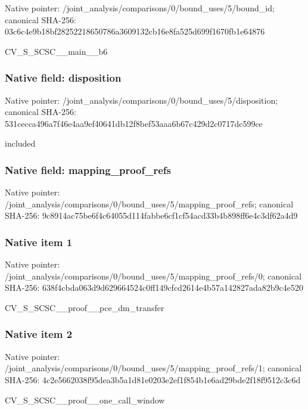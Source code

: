 \documentclass[10pt,a4paper]{article}
\begin{document}
Native pointer: /joint\_analysis/comparis\allowbreak{}ons/0/bound\_uses/5/bound\allowbreak{}\_id; canonical SHA-256: 03c6c4e9b18bf28252218650\allowbreak{}786a3609132cb16e8fa525d6\allowbreak{}99f1670fb1e64876


CV\_S\_SCSC\_\_main\_\_b6


\subsubsection{Native field: disposition}


Native pointer: /joint\_analysis/comparis\allowbreak{}ons/0/bound\_uses/5/dispo\allowbreak{}sition; canonical SHA-256: 531cecca496a7f46e4aa9ef4\allowbreak{}0641db12f8bef53aaa6b67c4\allowbreak{}29d2c0717dc599ce


included


\subsubsection{Native field: mapping\_proof\_refs}


Native pointer: /joint\_analysis/comparis\allowbreak{}ons/0/bound\_uses/5/mappi\allowbreak{}ng\_proof\_refs; canonical SHA-256: 9c8914ac75be6f4c64055d11\allowbreak{}4fabbe6cf1cf54acd33b4b89\allowbreak{}8ff6e4c3df62a4d9



\subsubsection{Native item 1}


Native pointer: /joint\_analysis/comparis\allowbreak{}ons/0/bound\_uses/5/mappi\allowbreak{}ng\_proof\_refs/0; canonical SHA-256: 638f4cbda063d9d629664524\allowbreak{}c0ff149cfcd2614e4b57a142\allowbreak{}827ada82b9c4e520


CV\_S\_SCSC\_\_proof\_\_pce\_dm\_transfer


\subsubsection{Native item 2}


Native pointer: /joint\_analysis/comparis\allowbreak{}ons/0/bound\_uses/5/mappi\allowbreak{}ng\_proof\_refs/1; canonical SHA-256: 4c2e5662038f95dea3b5a1d8\allowbreak{}1e0203e2ef1f854b1e6ad29b\allowbreak{}de2f18f9512c3c6d


CV\_S\_SCSC\_\_proof\_\_one\_call\_window
\end{document}
